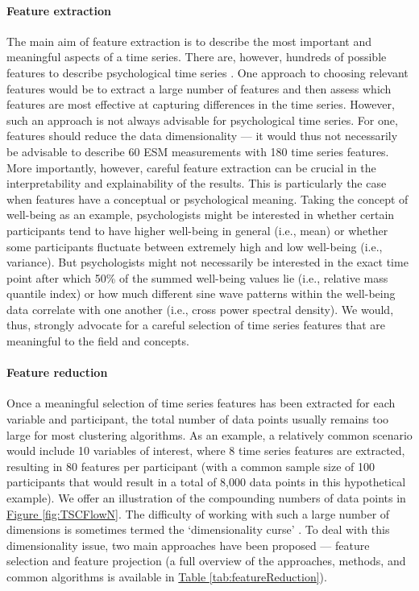 \documentclass[man, 12pt, a4paper, mask, floatsintext]{apa7}
\theoremstyle{break}
\theoremstyle{plain}
\newcommand{\fgrref}[2][]{\hyperref[#2]{Figure \ref*{#2}#1}}
\newcommand{\tblref}[2][]{\hyperref[#2]{Table \ref*{#2}#1}}
\begin{document}
\paragraph{Feature extraction}
The main aim of feature extraction is to describe the most important and meaningful aspects of a time series. There are, however, hundreds of possible features to describe psychological time series \citep[e.g., tsfresh][]{christ2018}. One approach to choosing relevant features would be to extract a large number of features and then assess which features are most effective at capturing differences in the time series. However, such an approach is not always advisable for psychological time series. For one, features should reduce the data dimensionality --- it would thus not necessarily be advisable to describe 60 ESM measurements with 180 time series features. More importantly, however, careful feature extraction can be crucial in the interpretability and explainability of the results. This is particularly the case when features have a conceptual or psychological meaning. Taking the concept of well-being as an example, psychologists might be interested in whether certain participants tend to have higher well-being in general (i.e., mean) or whether some participants fluctuate between extremely high and low well-being (i.e., variance). But psychologists might not necessarily be interested in the exact time point after which 50\% of the summed well-being values lie (i.e., relative mass quantile index) or how much different sine wave patterns within the well-being data correlate with one another (i.e., cross power spectral density). We would, thus, strongly advocate for a careful selection of time series features that are meaningful to the field and concepts.



\paragraph{Feature reduction}
Once a meaningful selection of time series features has been extracted for each variable and participant, the total number of data points usually remains too large for most clustering algorithms. As an example, a relatively common scenario would include 10 variables of interest, where 8 time series features are extracted, resulting in 80 features per participant (with a common sample size of 100 participants that would result in a total of 8,000 data points in this hypothetical example). We offer an illustration of the compounding numbers of data points in \fgrref{fig:TSCFlowN}. The difficulty of working with such a large number of dimensions is sometimes termed the `dimensionality curse' \citep[e.g.,][]{altman2018}. To deal with this dimensionality issue, two main approaches have been proposed --- feature selection and feature projection (a full overview of the approaches, methods, and common algorithms is available in \tblref{tab:featureReduction}). 
\end{document}
